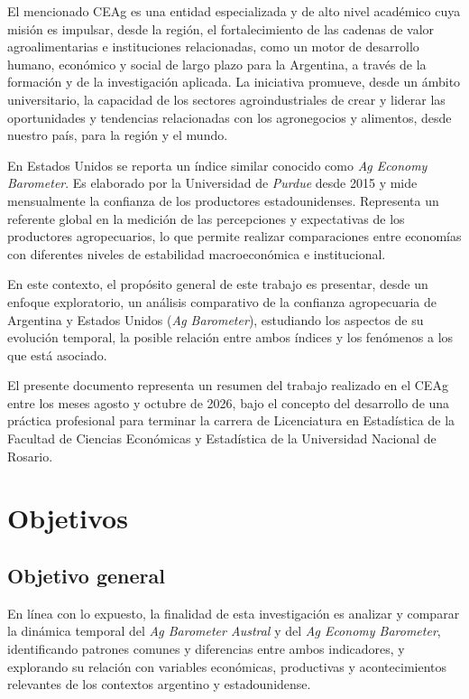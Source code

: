 \documentclass[12pt]{article}
\begin{document}
El mencionado CEAg es una entidad especializada y de alto nivel
académico cuya misión es impulsar, desde la región, el fortalecimiento
de las cadenas de valor agroalimentarias e instituciones relacionadas,
como un motor de desarrollo humano, económico y social de largo plazo
para la Argentina, a través de la formación y de la investigación
aplicada. La iniciativa promueve, desde un ámbito universitario, la
capacidad de los sectores agroindustriales de crear y liderar las
oportunidades y tendencias relacionadas con los agronegocios y
alimentos, desde nuestro país, para la región y el mundo.

En Estados Unidos se reporta un índice similar conocido como \emph{Ag
Economy Barometer}. Es elaborado por la Universidad de \emph{Purdue}
desde 2015 y mide mensualmente la confianza de los productores
estadounidenses. Representa un referente global en la medición de las
percepciones y expectativas de los productores agropecuarios, lo que
permite realizar comparaciones entre economías con diferentes niveles de
estabilidad macroeconómica e institucional.

En este contexto, el propósito general de este trabajo es presentar,
desde un enfoque exploratorio, un análisis comparativo de la confianza
agropecuaria de Argentina y Estados Unidos (\emph{Ag Barometer}),
estudiando los aspectos de su evolución temporal, la posible relación
entre ambos índices y los fenómenos a los que está asociado.

El presente documento representa un resumen del trabajo realizado en el
CEAg entre los meses agosto y octubre de 2026, bajo el concepto del
desarrollo de una práctica profesional para terminar la carrera de
Licenciatura en Estadística de la Facultad de Ciencias Económicas y
Estadística de la Universidad Nacional de Rosario.

\newpage

\section{Objetivos}\label{objetivos}

\subsection{Objetivo general}\label{objetivo-general}

En línea con lo expuesto, la finalidad de esta investigación es analizar
y comparar la dinámica temporal del \emph{Ag Barometer Austral} y del
\emph{Ag Economy Barometer}, identificando patrones comunes y
diferencias entre ambos indicadores, y explorando su relación con
variables económicas, productivas y acontecimientos relevantes de los
contextos argentino y estadounidense.
\end{document}
